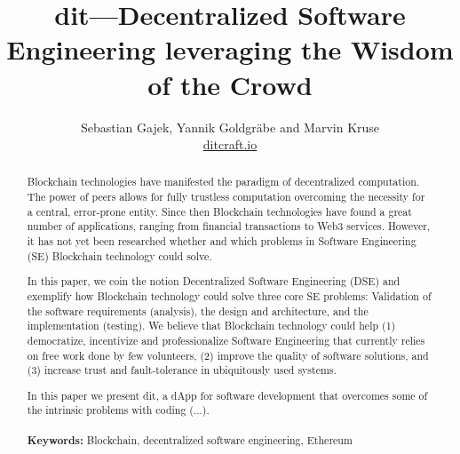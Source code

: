 \documentclass[12pt]{article}
\begin{document}
\title{dit---Decentralized Software Engineering leveraging the Wisdom of the Crowd}
\author{Sebastian Gajek, Yannik Goldgräbe and Marvin Kruse\\\url{ditcraft.io}}
\maketitle

\begin{abstract}
Blockchain technologies have manifested the paradigm of decentralized computation. The power of peers allows for fully trustless computation overcoming the necessity for a central, error-prone entity.  
%
Since then Blockchain technologies have found a great number of applications, ranging from financial transactions to Web3 services. However, it has not yet been researched whether and which problems in Software Engineering (SE) Blockchain technology could solve. 

In this paper, we coin the notion Decentralized Software Engineering (DSE) and exemplify how Blockchain technology could solve three core SE problems: Validation of the software requirements (analysis), the design and architecture, and the implementation (testing).
%
We believe that Blockchain technology could help (1) democratize, incentivize and professionalize Software Engineering that currently relies on free work done by few volunteers, (2) improve the quality of software solutions, and (3) increase trust and fault-tolerance in ubiquitously used systems.
 

In this paper we present dit, a dApp for software development that overcomes some of the intrinsic problems with coding (...).
\\
\\\textbf{Keywords: } Blockchain, decentralized software engineering, Ethereum
\end{abstract}



\end{document}
